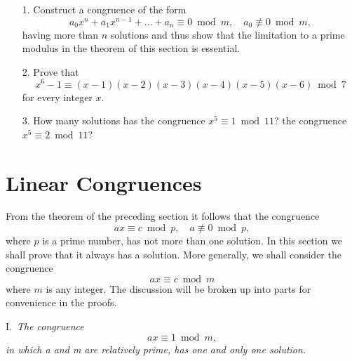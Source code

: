 \documentclass[oneside]{book}
\begin{document}
\small \begin{enumerate}
\item[1.] Construct a congruence of the form
\begin{equation*}
a_0 x^n + a_1 x^{n-1} + \ldots + a_n \equiv 0 \bmod m, \quad
  a_0 \not\equiv 0 \bmod m,
\end{equation*}
having more than $n$ solutions and thus show that the limitation to
a prime modulus in the theorem of this section is essential.

\item[2.] Prove that
\begin{equation*}
x^6-1 \equiv (x-1)(x-2)(x-3)(x-4)(x-5)(x-6) \bmod 7
\end{equation*}
for every integer $x$.

\item[3.] How many solutions has the congruence $x^5 \equiv 1 \bmod
11$? the congruence $x^5\equiv 2 \bmod 11$?
\end{enumerate}\normalsize{}

\section{Linear Congruences}\label{s22}%

From the theorem of the preceding section it follows that the
congruence
\begin{equation*}
ax \equiv c \bmod p,\quad a \not\equiv 0 \bmod p,
\end{equation*}
where $p$ is a prime number, has not more than one solution. In this
section we shall prove that it always has a solution. More
generally, we shall consider the congruence
\begin{equation*}
ax \equiv c \bmod m
\end{equation*}
where $m$ is any integer. The discussion will be broken up into
parts for convenience in the proofs.

\smallskip I.~\emph{The congruence}
\begin{equation}
ax \equiv 1 \bmod m, \tag{1}
\end{equation}
\emph{in which a and m are relatively prime, has one and only one
solution.}
\end{document}
